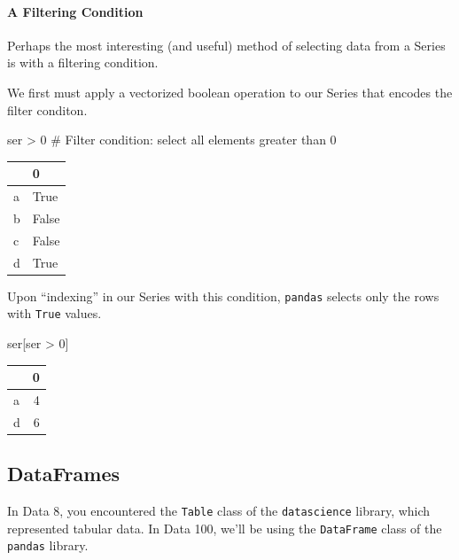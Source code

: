 \documentclass[
  letterpaper,
  DIV=11,
  numbers=noendperiod]{scrreprt}
\let\oldparagraph\paragraph
\renewcommand{\paragraph}[1]{\oldparagraph{#1}\mbox{}}
\newenvironment{Shaded}{\begin{snugshade}}{\end{snugshade}}
\newcommand{\CommentTok}[1]{\textcolor[rgb]{0.37,0.37,0.37}{#1}}
\newcommand{\DecValTok}[1]{\textcolor[rgb]{0.68,0.00,0.00}{#1}}
\newcommand{\NormalTok}[1]{\textcolor[rgb]{0.00,0.23,0.31}{#1}}
\newcommand{\OperatorTok}[1]{\textcolor[rgb]{0.37,0.37,0.37}{#1}}
\begin{document}
\hypertarget{a-filtering-condition}{%
\paragraph{A Filtering Condition}\label{a-filtering-condition}}

Perhaps the most interesting (and useful) method of selecting data from
a Series is with a filtering condition.

We first must apply a vectorized boolean operation to our Series that
encodes the filter conditon.

\begin{Shaded}
\begin{Highlighting}[]
\NormalTok{ser }\OperatorTok{\textgreater{}} \DecValTok{0} \CommentTok{\# Filter condition: select all elements greater than 0}
\end{Highlighting}
\end{Shaded}

\begin{tabular}{ll}
\toprule
{} &      0 \\
\midrule
a &   True \\
b &  False \\
c &  False \\
d &   True \\
\bottomrule
\end{tabular}

Upon ``indexing'' in our Series with this condition, \texttt{pandas}
selects only the rows with \texttt{True} values.

\begin{Shaded}
\begin{Highlighting}[]
\NormalTok{ser[ser }\OperatorTok{\textgreater{}} \DecValTok{0}\NormalTok{] }
\end{Highlighting}
\end{Shaded}

\begin{tabular}{lr}
\toprule
{} &  0 \\
\midrule
a &  4 \\
d &  6 \\
\bottomrule
\end{tabular}

\hypertarget{dataframes}{%
\subsection{DataFrames}\label{dataframes}}

In Data 8, you encountered the \texttt{Table} class of the
\texttt{datascience} library, which represented tabular data. In Data
100, we'll be using the \texttt{DataFrame} class of the \texttt{pandas}
library.
\end{document}
